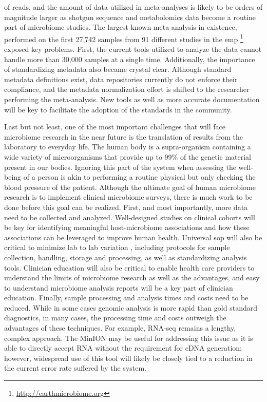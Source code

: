 of reads, and the amount of data utilized in meta-analyses is likely to be orders
of magnitude larger as shotgun sequence and metabolomics data become a routine part
of microbiome studies. The largest known meta-analysis in existence, performed on
the first 27,742 samples from 91 different studies in the \gls{emp}
\footnote{\label{empurl}\url{http://earthmicrobiome.org}} exposed key problems.
First, the current tools utilized to analyze the data cannot handle more than
30,000 samples at a single time. Additionally, the importance of standardizing
metadata also became crystal clear. Although standard metadata definitions exist,
data repositories currently do not enforce their compliance, and the metadata
normalization effort is shifted to the researcher performing the meta-analysis.
New tools as well as more accurate documentation will be key to facilitate the
adoption of the standards in the community.

Last but not least, one of the most important challenges that will face microbiome
research in the near future is the translation of results from the laboratory to
everyday life. The human body is a supra-organism containing a wide variety of
microorganisms that provide up to 99\% of the genetic material present in our
bodies. Ignoring this part of the system when assessing the well-being of a person
is akin to performing a routine physical but only checking the blood pressure of
the patient. Although the ultimate goal of human microbiome research is to implement
clinical microbiome surveys, there is much work to be done before this goal can be
realized. First, and most importantly, more data need to be collected and analyzed.
Well-designed studies on clinical cohorts will be key for identifying meaningful
host-microbiome associations and how these associations can be leveraged to improve
human health. Universal \gls{sop} will also be critical to minimize lab to lab
variation \cite{Sinha2015}, including protocols for sample collection, handling,
storage and processing, as well as standardizing analysis tools. Clinician
education will also be critical to enable health care providers to understand the
limits of microbiome research as well as the advantages, and easy to understand
microbiome analysis reports will be a key part of clinician education. Finally,
sample processing and analysis times and costs need to be reduced. While in some
cases genomic analysis is more rapid than gold standard diagnostics, in many cases,
the processing time and costs outweigh the advantages of these techniques. For
example, RNA-seq remains a lengthy, complex approach. The MinION may be useful for
addressing this issue as it is able to directly accept RNA without the requirement
for cDNA generation; however, widespread use of this tool will likely be closely
tied to a reduction in the current error rate suffered by the system.

